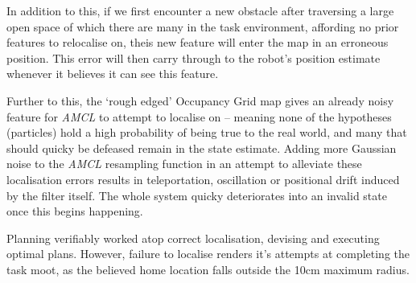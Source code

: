 \documentclass[11pt, a4paper]{article}
\begin{document}
In addition to this, if we first encounter a new obstacle after traversing a large open
space of which there are many in the task environment, affording no prior features to 
relocalise on, theis new feature will enter the 
map in an erroneous position. This error will then carry through to the robot's 
position estimate whenever it believes it can see this feature.

Further to this, the `rough edged' Occupancy Grid map gives an already noisy feature for
\textit{AMCL} to attempt to localise on -- meaning none of the hypotheses (particles)
hold a high probability of being true to the real world, and many that should quicky be 
defeased remain in the state estimate. Adding more Gaussian noise to
the \textit{AMCL} resampling function in an attempt to alleviate these localisation errors 
results in teleportation, oscillation or positional drift induced by the filter
itself. The whole system quicky deteriorates into an invalid state once this begins 
happening.

Planning verifiably worked atop correct localisation, devising and executing optimal plans.
However, failure to localise renders it's attempts at completing the task moot, as the
believed home location falls outside the 10cm maximum radius.


\end{document}
